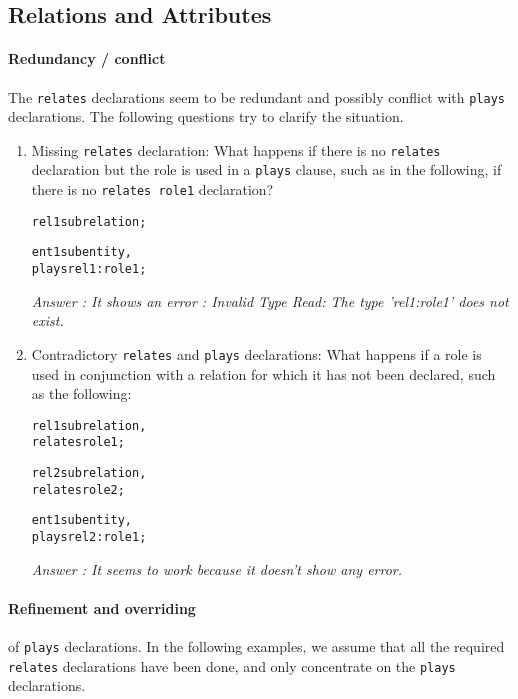 \documentclass[runningheads]{llncs}
\begin{document}
\subsection{Relations and Attributes}\label{sec:questions_rels_attribs}

\paragraph{Redundancy / conflict} The \texttt{relates} declarations seem to be
redundant and possibly conflict with \texttt{plays} declarations. The
following questions try to clarify the situation.

\begin{enumerate}
\item Missing \texttt{relates} declaration: What happens if there is no
  \texttt{relates} declaration but the role is used in a \texttt{plays}
  clause, such as in the following, if there is no \texttt{relates role1}
  declaration?

  \begin{alltt}
rel1 sub relation;

ent1 sub entity,
  plays rel1:role1;
  \end{alltt}

\emph{Answer : It shows an error : Invalid Type Read: The type 'rel1:role1' does not exist. }


\item Contradictory \texttt{relates} and \texttt{plays} declarations: What
  happens if a role is used in conjunction with a relation for which it has
  not been declared, such as the following:

  \begin{alltt}
rel1 sub relation,
  relates role1;

rel2 sub relation,
  relates role2;

ent1 sub entity,
  plays rel2:role1;
  \end{alltt}

\emph{Answer : It seems to work because it doesn't show any error. }


\end{enumerate}

\paragraph{Refinement and overriding} of \texttt{plays} declarations. In the
following examples, we assume that all the required \texttt{relates}
declarations have been done, and only concentrate on the \texttt{plays}
declarations.
\end{document}
